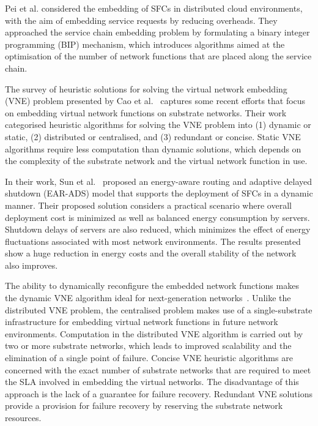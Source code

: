 \documentclass[futureinternet,review,accept,pdftex,moreauthors]{Definitions/mdpi}
\begin{document}
Pei {et al.} considered the embedding of SFCs in distributed cloud environments, with the aim of embedding service requests by reducing overheads. They approached the service chain embedding problem by formulating a binary integer programming (BIP) mechanism, which introduces algorithms aimed at the optimisation of the number of network functions that are placed along the service chain. 

The survey of heuristic solutions for solving the virtual network embedding (VNE) problem presented by Cao {et al.}~\cite{cao2018heuristic} captures some recent efforts that focus on embedding virtual network functions on substrate networks. Their work categorised heuristic algorithms for solving the VNE problem into (1) dynamic or static, (2) distributed or centralised, and (3) redundant or concise. Static VNE algorithms require less computation than dynamic solutions, which depends on the complexity of the substrate network and the virtual network function in use. 

In their work, Sun 
{et al.}~\cite{sun2020energy} proposed an energy-aware routing and adaptive delayed shutdown (EAR-ADS) model that supports the deployment of SFCs in a dynamic manner. Their proposed solution considers a practical scenario where overall deployment cost is minimized as well as balanced energy consumption by servers. Shutdown delays of servers are also reduced, which minimizes the effect of energy fluctuations associated with most network environments. The results presented show a huge reduction in energy costs and the overall stability of the network also improves.

The ability to dynamically reconfigure the embedded network functions makes the dynamic VNE algorithm ideal for next-generation networks~\cite{li2021multi}. Unlike the distributed VNE problem, the centralised problem makes use of a single-substrate infrastructure for embedding virtual network functions in future network environments. Computation in the distributed VNE algorithm is carried out by two or more substrate networks, which leads to improved scalability and the elimination of a single point of failure. Concise VNE heuristic algorithms are concerned with the exact number of substrate networks that are required to meet the SLA involved in embedding the virtual networks. The disadvantage of this approach is the lack of a guarantee for failure recovery. Redundant VNE solutions provide a provision for failure recovery by reserving the substrate network resources.   
\end{document}
